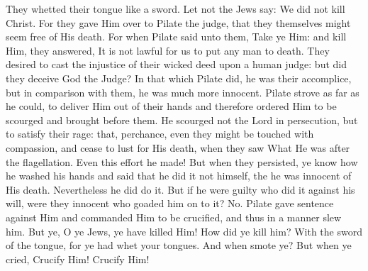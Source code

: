 {{They whetted their tongue like a sword. Let not the Jews say: We did not kill Christ. For they gave Him over to Pilate the judge, that they themselves might seem free of His death. For when Pilate said unto them, Take ye Him: and kill Him, they answered, It is not lawful for us to put any man to death. They desired to cast the injustice of their wicked deed upon a human judge: but did they deceive God the Judge? In that which Pilate did, he was their accomplice, but in comparison with them, he was much more innocent. Pilate strove as far as he could, to deliver Him out of their hands and therefore ordered Him to be scourged and brought before them. He scourged not the Lord in persecution, but to satisfy their rage: that, perchance, even they might be touched with compassion, and cease to lust for His death, when they saw What He was after the flagellation. Even this effort he made! But when they persisted, ye know how he washed his hands and said that he did it not himself, the he was innocent of His death. Nevertheless he did do it. But if he were guilty who did it against his will, were they innocent who goaded him on to it? No. Pilate gave sentence against Him and commanded Him to be crucified, and thus in a manner slew him. But ye, O ye Jews, ye have killed Him! How did ye kill him? With the sword of the tongue, for ye had whet your tongues. And when smote ye? But when ye cried, Crucify Him! Crucify Him!}
}%

\bigskip\bigskip
\pagebreak
{\myrespsize
\label{resp6_animam_meam}
}

{}
